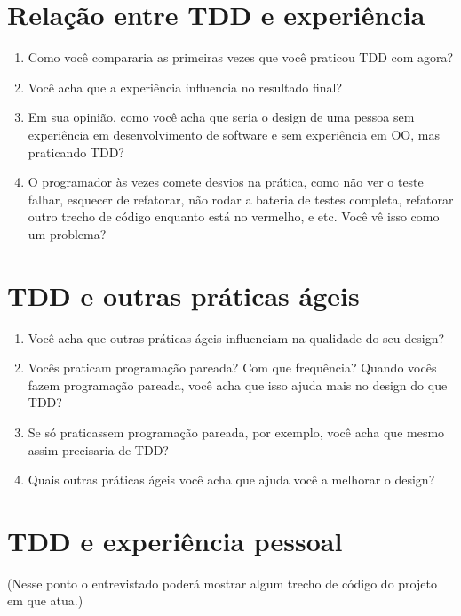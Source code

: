 \section{Relação entre TDD e experiência}

\begin{enumerate}
	\item Como você compararia as primeiras vezes que você praticou TDD com agora?
	\item Você acha que a experiência influencia no resultado final?
	\item Em sua opinião, como você acha que seria o design de uma pessoa sem experiência em desenvolvimento de software e sem experiência em OO, mas praticando TDD?
	\item O programador às vezes comete desvios na prática, como não ver o teste falhar, esquecer de refatorar, não rodar a bateria de testes completa, refatorar outro trecho de código enquanto está no vermelho, e etc. Você vê isso como um problema?
\end{enumerate}

\section{TDD e outras práticas ágeis}

\begin{enumerate}
	\item Você acha que outras práticas ágeis influenciam na qualidade do seu design?
	\item Vocês praticam programação pareada? Com que frequência? Quando vocês fazem programação pareada, você acha que isso ajuda mais no design do que TDD?
	\item Se só praticassem programação pareada, por exemplo, você acha que mesmo assim precisaria de TDD?
	\item Quais outras práticas ágeis você acha que ajuda você a melhorar o design?
\end{enumerate}

\section{TDD e experiência pessoal}

(Nesse ponto o entrevistado poderá mostrar algum trecho de código do projeto em que atua.)

